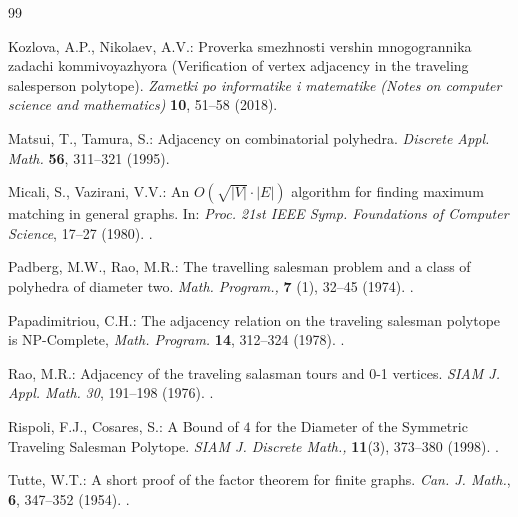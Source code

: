 \documentclass[runningheads]{llncs}
\begin{document}
\begin{thebibliography}{99}
	
	Kozlova, A.P., Nikolaev, A.V.:
	Proverka smezhnosti vershin mnogogrannika zadachi kommivoyazhyora (Verification of vertex adjacency in the traveling salesperson polytope).
	{\em Zametki po informatike i matematike (Notes on computer science and mathematics)} {\bf 10}, 51--58 (2018).
	
	
	Matsui, T., Tamura, S.:
	Adjacency on combinatorial polyhedra.
	{\em Discrete Appl. Math.} {\bf 56}, 311--321 (1995).
	
	
	Micali, S., Vazirani, V.V.:
	An $O({\sqrt {|V|}}\cdot |E|)$ algorithm for finding maximum matching in general graphs.
	In: {\em Proc. 21st IEEE Symp. Foundations of Computer Science}, 17--27 (1980).
	.
	
	
	Padberg, M.W., Rao, M.R.:
	The travelling salesman problem and a class of polyhedra of diameter two.
	{\em Math. Program.,} {\bf 7} (1), 32--45 (1974).
	.
	
	
	Papadimitriou, C.H.:
	The adjacency relation on the traveling salesman polytope is NP-Complete,
	{\em Math. Program.} {\bf 14}, 312--324 (1978).
	. 
	
	
	Rao, M.R.:
	Adjacency of the traveling salasman tours and 0-1 vertices.
	{\em SIAM J. Appl. Math.} {\em 30}, 191--198 (1976).
	.
	
	
	Rispoli, F.J., Cosares, S.:
	A Bound of $4$ for the Diameter of the Symmetric Traveling Salesman Polytope.
	{\em SIAM J. Discrete Math.,} {\bf 11}(3), 373--380 (1998).
	.
	
	
	Tutte, W.T.:
	A short proof of the factor theorem for finite graphs.
	{\em Can. J. Math.}, {\bf 6}, 347--352 (1954).
	.
	
	
\end{thebibliography}








\end{document}
